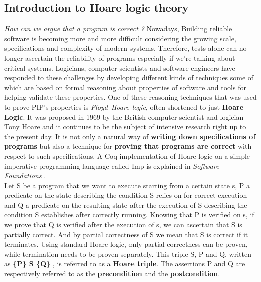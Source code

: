 \subsection{Introduction to Hoare logic theory} \label{HoareIntro}
\textit{How can we argue that a program is correct ?}
Nowadays, Building reliable software is becoming more and more difficult considering the growing scale, specifications and complexity of modern systems. Therefore, tests alone can no longer ascertain the reliability of programs especially if we're talking about critical systems. Logicians, computer scientists and software engineers have responded to these challenges by developing different kinds of techniques some of which are based on formal reasoning about properties of software and tools for helping validate these properties. One of these reasoning techniques that was used to prove PIP's properties is \textit{Floyd–Hoare logic}, often shortened to just \textbf{Hoare Logic}. It was proposed in 1969 by the British computer scientist and logician Tony Hoare \cite{Hoare} and it continues to be the subject of intensive research right up to the present day. It is not only a natural way of \textbf{writing down specifications of programs} but also a technique for \textbf{proving that programs are correct} with respect to such specifications. A Coq implementation of Hoare logic on a simple imperative programming language called Imp is explained in \textit{Software Foundations} \cite{SoftwareFoundation}. \\  %

Let S be a program that we want to execute starting from a certain state s, P a predicate on the state describing the condition S relies on for correct execution and Q a predicate on the resulting state after the execution of S describing the condition S establishes after correctly running. Knowing that P is verified on s, if we prove that Q is verified after the execution of s, we can ascertain that S is partially correct. And by partial correctness of S we mean that S is correct if it terminates. Using standard Hoare logic, only partial correctness can be proven, while termination needs to be proven separately. This triple S, P and Q, written as \textbf{ \{P\} S \{Q\} }, is referred to as a \textbf{Hoare triple}. The assertions P and Q are respectively referred to as the \textbf{precondition} and the \textbf{postcondition}. \\


